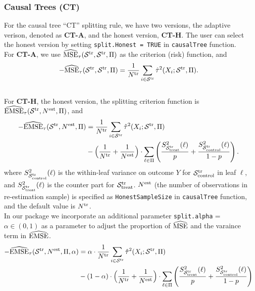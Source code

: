 \documentclass[11pt]{article}
\newcommand{\emse}{{\rm EMSE}}
\newcommand{\est}{{\rm est}}
\newcommand{\calp}{{\Pi}}
\newcommand{\cals}{{\cal S}}
\newcommand{\mse}{{\rm MSE}}
\newcommand{\control}{{\rm control}}
\newcommand{\treat}{{\rm treat}}
\newcommand{\train}{{\rm tr}}
\begin{document}
\subsubsection{Causal Trees (\textbf{CT})}
For the causal tree ``CT'' splitting rule, we have two versions, the adaptive verison, denoted as \textbf{CT-A}, and the honest version, \textbf{CT-H}. The user can select the honest version by setting \texttt{split.Honest = TRUE} in \texttt{causalTree} function. \\
For \textbf{CT-A}, we use $\widehat{\mse}_\tau(\cals^\train,\cals^\train,\calp)$ as the criterion (risk) function, and
\[-\widehat{\mse}_\tau(\cals^\train,\cals^\train,\calp) = \frac{1}{N^\train}\sum_{i\in\cals^\train} \hat\tau^2(X_i;\cals^\train,\calp).\]
\\
For \textbf{CT-H}, the honest version, the splitting criterion function is $\widehat{\emse}_\tau(\cals^\train, N^\est, \calp)$, and
\begin{align*}
-\widehat{\emse}_\tau(\cals^\train, N^\est, \calp) & = 
\frac{1}{N^\train}\sum_{i\in\cals^\train} \hat\tau^2(X_i;\cals^\train,\calp) \\
& -
\Bigl(\frac{1}{N^\train} + \frac{1}{N^\est}\Bigr)\cdot \sum_{\ell\in\calp}
\left( \frac{S^2_{\cals^\train_\treat}(\ell)}{p}+ \frac{S^2_{\cals^\train_\control}(\ell)}{1-p}\right).
\end{align*}
where $S^2_{\cals^\train_\control}(\ell)$ is the within-leaf variance on outcome $Y$ for $\cals^\train_\control$ in leaf $\ell$, and $S^2_{\cals^\train_\treat}(\ell)$ is the counter part for $\cals^\train_\treat$. $N^\est$ (the number of observations in re-estimation sample) is specified as \texttt{HonestSampleSize} in \texttt{causalTree} function, and the default value is $N^\train$.\\
In our package we incorporate an additional parameter \texttt{split.alpha} = $\alpha \in (0, 1)$ as a parameter to adjust the proportion of $\widehat{\mse}$ and the varaince term in $\widehat{\emse}$.
\begin{align*}
-\widehat{\emse}_\tau(\cals^\train, N^\est, \calp, \alpha) &= 
\alpha \cdot \frac{1}{N^\train}\sum_{i\in\cals^\train} \hat\tau^2(X_i;\cals^\train,\calp) \\
& - (1 - \alpha) \cdot
\Bigl(\frac{1}{N^\train} + \frac{1}{N^\est}\Bigr) \cdot \sum_{\ell\in\calp}
\left( \frac{S^2_{\cals^\train_\treat}(\ell)}{p}+ \frac{S^2_{\cals^\train_\control}(\ell)}{1-p}\right)
\end{align*}
\end{document}
